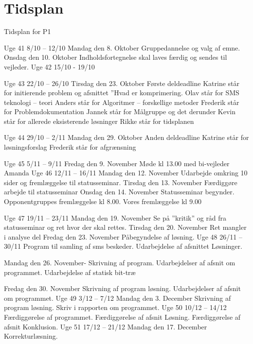 \section{Tidsplan}
Tidsplan for P1

Uge 41 8/10 – 12/10
Mandag den 8. Oktober                            Gruppedannelse og valg af emne.
Onsdag den 10. Oktober                          Indholdsfortegnelse skal laves færdig og sendes til vejleder.
Uge 42 15/10 - 19/10
 
Uge 43 22/10 – 26/10
Tirsdag den 23. Oktober                          Første deldeadline
Katrine står for initierende problem og afsnittet ”Hvad er komprimering.
Olav står for SMS teknologi – teori
Anders står for Algoritmer – forskellige metoder
Frederik står for Problemdokumentation
Jannek står for Målgruppe og det derunder
Kevin står for allerede eksisterende løsninger
Rikke står for tidsplanen
 
Uge 44 29/10 – 2/11
Mandag den 29. Oktober                         Anden deldeadline
                                                                 Katrine står for løsningsforslag
                                                                 Frederik står for afgrænsning
                                                                              	
Uge 45 5/11 – 9/11
Fredag den 9. November                         Møde kl 13.00 med bi-vejleder Amanda
Uge 46 12/11 – 16/11
Mandag den 12. November                      Udarbejde omkring 10 sider og fremlæggelse til statusseminar.
Tirsdag den 13. November                       Færdiggøre arbejde til statusseminar
Onsdag den 14. November                      Statusseminar begynder. 
Opponentgruppes fremlæggelse kl 8.00. 
Vores fremlæggelse kl 9.00

Uge 47 19/11 – 23/11
Mandag den 19. November                      Se på ”kritik” og råd fra statusseminar og ret hvor der skal rettes.
Tirsdag den 20. November                      Ret mangler i analyse del
Fredag den 23. November                       Påbegyndelse af løsning.
Uge 48 26/11 – 30/11
	Program til samling af sms beskeder. 
Udarbejdelse af afsnittet Løsninger.

Mandag den 26. November-                     Skrivning af program. 
Udarbejdelser af afsnit om programmet. 
Udarbejdelse af statisk bit-træ

Fredag den 30. November	Skrivning af program løsning. 
Udarbejdelser af afsnit om programmet.
Uge 49 3/12 – 7/12
Mandag den 3. December	Skrivning af program løsning. 
Skriv i rapporten om programmet.
Uge 50 10/12 – 14/12
	Færdiggørelse af programmet.
Færdiggørelse af afsnit Løsning.
Færdiggørelse af afsnit Konklusion.
Uge 51 17/12 – 21/12
Mandag den 17. December                     Korrekturlæsning.

